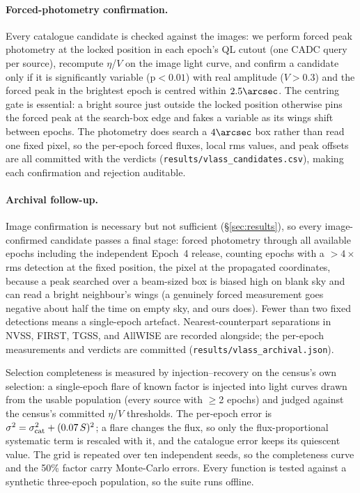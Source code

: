 \documentclass[twocolumn]{aastex631}
\newcommand{\code}[1]{\texttt{#1}}
\begin{document}
\paragraph{Forced-photometry confirmation.} Every catalogue candidate is checked against the images:
we perform forced peak photometry at the locked position in each epoch's QL cutout (one CADC query
per source), recompute $\eta$/$V$ on the image light curve, and confirm a candidate only if it
is significantly variable (p$<0.01$) with real amplitude ($V>0.3$) and the forced peak in the
brightest epoch is centred within $2.5\arcsec$. The centring gate is essential: a bright source just
outside the locked position otherwise pins the forced peak at the search-box edge and fakes a
variable as its wings shift between epochs. The photometry does search a $4\arcsec$ box rather than
read one fixed pixel, so the per-epoch forced fluxes, local rms values, and peak offsets are all
committed with the verdicts (\code{results/vlass\_candidates.csv}), making each confirmation and
rejection auditable.

\paragraph{Archival follow-up.} Image confirmation is necessary but not sufficient (\S\ref{sec:results}),
so every image-confirmed candidate passes a final stage: forced photometry through all available
epochs including the independent Epoch~4 release, counting epochs with a $>4\times$rms detection
at the fixed position, the pixel at the propagated coordinates, because a peak searched
over a beam-sized box is biased high on blank sky and can read a bright neighbour's wings (a
genuinely forced measurement goes negative about half the time on empty sky, and ours does).
Fewer than two fixed detections means a single-epoch artefact. Nearest-counterpart separations in
NVSS, FIRST, TGSS, and AllWISE are recorded alongside; the per-epoch measurements and verdicts are
committed (\code{results/vlass\_archival.json}).

Selection completeness is measured by injection--recovery on the census's own selection: a
single-epoch flare of known factor is injected into light curves drawn from the usable population
(every source with $\ge$2 epochs) and judged against the census's committed $\eta$/$V$ thresholds.
The per-epoch error is $\sigma^2=\sigma_{\rm cat}^2+(0.07\,S)^2$; a flare changes the flux, so only
the flux-proportional systematic term is rescaled with it, and the catalogue error keeps its
quiescent value. The grid is repeated over ten independent seeds, so the completeness curve and the
50\% factor carry Monte-Carlo errors. Every function is tested against a synthetic three-epoch
population, so the suite runs offline.
\end{document}
